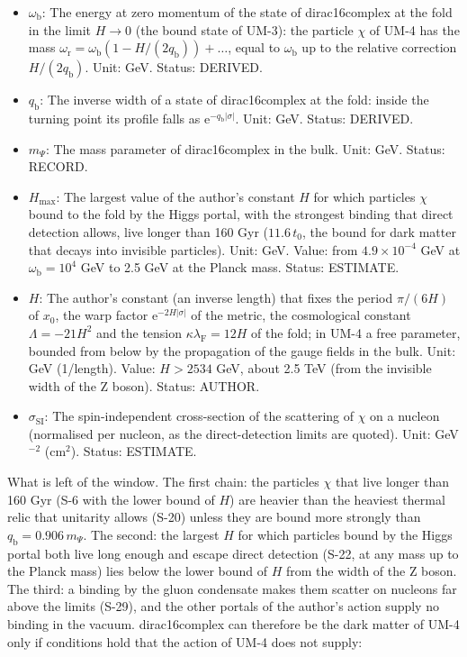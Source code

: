 \documentclass[
  10pt,
]{article}
\providecommand{\tightlist}{%
  \setlength{\itemsep}{0pt}\setlength{\parskip}{0pt}}
\begin{document}
\begin{itemize}
\tightlist
\item
  \(\omega_{\mathrm{b}}\): The energy at zero momentum of the state of
  dirac16complex at the fold in the limit \(H \to 0\) (the bound state
  of UM-3): the particle \(\chi\) of UM-4 has the mass
  \(\omega_{\mathrm{r}} = \omega_{\mathrm{b}}(1 - H/(2q_{\mathrm{b}})) + \dots\),
  equal to \(\omega_{\mathrm{b}}\) up to the relative correction
  \(H/(2q_{\mathrm{b}})\). Unit: GeV. Status: DERIVED.
\item
  \(q_{\mathrm{b}}\): The inverse width of a state of dirac16complex at
  the fold: inside the turning point its profile falls as
  \(\mathrm{e}^{-q_{\mathrm{b}}\lvert\sigma\rvert}\). Unit: GeV. Status:
  DERIVED.
\item
  \(m_\Psi\): The mass parameter of dirac16complex in the bulk. Unit:
  GeV. Status: RECORD.
\item
  \(H_{\max}\): The largest value of the author's constant \(H\) for
  which particles \(\chi\) bound to the fold by the Higgs portal, with
  the strongest binding that direct detection allows, live longer than
  160 Gyr (\(11.6\,t_0\), the bound for dark matter that decays into
  invisible particles). Unit: GeV. Value: from \(4.9\times10^{-4}\) GeV
  at \(\omega_{\mathrm{b}} = 10^4\) GeV to 2.5 GeV at the Planck mass.
  Status: ESTIMATE.
\item
  \(H\): The author's constant (an inverse length) that fixes the period
  \(\pi/(6H)\) of \(x_0\), the warp factor
  \(\mathrm{e}^{-2H\lvert\sigma\rvert}\) of the metric, the cosmological
  constant \(\Lambda = -21H^2\) and the tension
  \(\kappa\lambda_{\mathrm{F}} = 12H\) of the fold; in UM-4 a free
  parameter, bounded from below by the propagation of the gauge fields
  in the bulk. Unit: GeV (1/length). Value: \(H > 2534\) GeV, about 2.5
  TeV (from the invisible width of the Z boson). Status: AUTHOR.
\item
  \(\sigma_{\mathrm{SI}}\): The spin-independent cross-section of the
  scattering of \(\chi\) on a nucleon (normalised per nucleon, as the
  direct-detection limits are quoted). Unit: GeV\(^{-2}\) (cm\(^2\)).
  Status: ESTIMATE.
\end{itemize}

What is left of the window. The first chain: the particles \(\chi\) that
live longer than 160 Gyr (S-6 with the lower bound of \(H\)) are heavier
than the heaviest thermal relic that unitarity allows (S-20) unless they
are bound more strongly than \(q_{\mathrm{b}} = 0.906\,m_\Psi\). The
second: the largest \(H\) for which particles bound by the Higgs portal
both live long enough and escape direct detection (S-22, at any mass up
to the Planck mass) lies below the lower bound of \(H\) from the width
of the Z boson. The third: a binding by the gluon condensate makes them
scatter on nucleons far above the limits (S-29), and the other portals
of the author's action supply no binding in the vacuum. dirac16complex
can therefore be the dark matter of UM-4 only if conditions hold that
the action of UM-4 does not supply:
\end{document}
